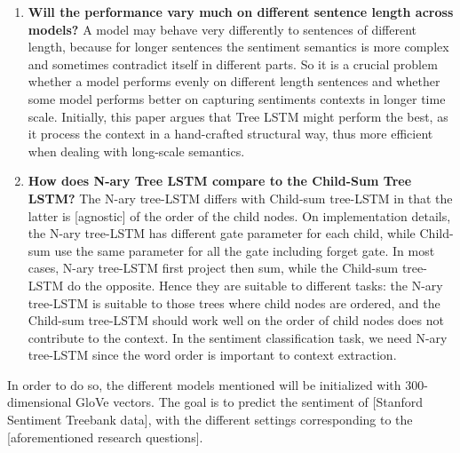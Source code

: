 \begin{enumerate}
    \item \textbf{Will the performance vary much on different sentence length across models?}
    A model may behave very differently to sentences of different length,
    because for longer sentences the sentiment semantics is more complex and
    sometimes contradict itself in different parts. So it is a crucial problem
    whether a model performs evenly on different length sentences and whether
    some model performs better on capturing sentiments contexts in longer time
    scale. Initially, this paper argues that Tree LSTM might perform the best,
    as it process the context in a hand-crafted structural way, thus more
    efficient when dealing with long-scale semantics.
    \item \textbf{How does N-ary Tree LSTM compare to the Child-Sum Tree LSTM?}
    The N-ary tree-LSTM differs with Child-sum tree-LSTM in that the latter is
    [agnostic] of the order of the child nodes. On implementation details, the
    N-ary tree-LSTM has different gate parameter for each child, while Child-sum
    use the same parameter for all the gate including forget gate. In most
    cases, N-ary tree-LSTM first project then sum, while the Child-sum tree-LSTM
    do the opposite. Hence they are suitable to different tasks: the N-ary
    tree-LSTM is suitable to those trees where child nodes are ordered, and the
    Child-sum tree-LSTM should work well on the order of child nodes does not
    contribute to the context. In the sentiment classification task, we need
    N-ary tree-LSTM since the word order is important to context extraction.
\end{enumerate}

In order to do so, the different models mentioned will be initialized with
300-dimensional GloVe\cite{pennington2014glove} vectors. The goal is to predict
the sentiment of [Stanford Sentiment Treebank data], with the different settings
corresponding to the [aforementioned research questions].
